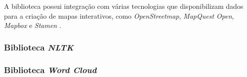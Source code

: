 A biblioteca possui integração com várias tecnologias que disponibilizam dados para a criação de mapas interativos, como \textit{OpenStreetmap}, \textit{MapQuest Open}, \textit{Mapbox} e \textit{Stamen} \cite{folium}.

\subsubsection{Biblioteca \textit{NLTK}}

%
%
%

\subsubsection{Biblioteca \textit{Word Cloud}}


